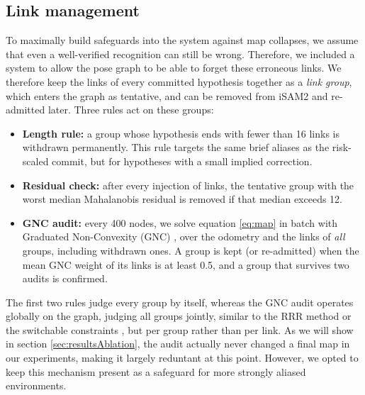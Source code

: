 \subsection{Link management}
To maximally build safeguards into the system against map collapses, we assume that even a well-verified recognition can still be wrong. Therefore, we included a system to allow the pose graph to be able to forget these erroneous links. We therefore keep the links of every committed hypothesis together as a \emph{link group}, which enters the graph as tentative, and can be removed from iSAM2 and re-admitted later. Three rules act on these groups:
\begin{itemize}
\item \textbf{Length rule:} a group whose hypothesis ends with fewer than 16 links is withdrawn permanently. This rule targets the same brief aliases as the risk-scaled commit, but for hypotheses with a small implied correction.
\item \textbf{Residual check:} after every injection of links, the tentative group with the worst median Mahalanobis residual is removed if that median exceeds 12.
\item \textbf{GNC audit:} every 400 nodes, we solve equation \ref{eq:map} in batch with Graduated Non-Convexity (GNC) \cite{yangGraduatedNonConvexityRobust2020}, over the odometry and the links of \emph{all} groups, including withdrawn ones. A group is kept (or re-admitted) when the mean GNC weight of its links is at least 0.5, and a group that survives two audits is confirmed.
\end{itemize}
The first two rules judge every group by itself, whereas the GNC audit operates globally on the graph, judging all groups jointly, similar to the RRR method \cite{latifRobustLoopClosing2013} or the switchable constraints \cite{sunderhaufSwitchableConstraintsRobust2012}, but per group rather than per link. As we will show in section \ref{sec:resultsAblation}, the audit actually never changed a final map in our experiments, making it largely reduntant at this point. However, we opted to keep this mechanism present as a safeguard for more strongly aliased environments.

